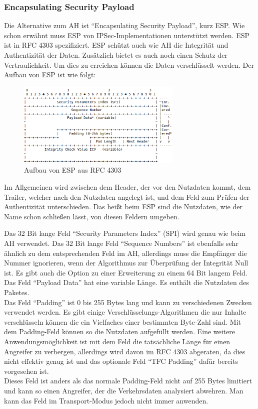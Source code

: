 \documentclass[12pt]{scrartcl}
\begin{document}
\subsubsection{Encapsulating Security Payload}
Die Alternative zum AH ist "`Encapsulating Security Payload"', kurz ESP. Wie schon erwähnt muss ESP von IPSec-Implementationen unterstützt werden. ESP ist in RFC 4303 spezifiziert.\cite{RFC4303}
ESP schützt auch wie AH die Integrität und Authentizität der Daten. Zusätzlich bietet es auch noch einen Schutz der Vertraulichkeit. Um dies zu erreichen können die Daten verschlüsselt werden. Der Aufbau von ESP ist wie folgt:
\begin{figure}[htbp] 
  \centering
     \includegraphics[width=0.7\textwidth]{ESP-Aufbau.png}
  \caption{Aufbau von ESP aus RFC 4303}
  \label{ESP-Aufbau}
\end{figure}
Im Allgemeinen wird zwischen dem Header, der vor den Nutzdaten kommt, dem Trailer, welcher nach den Nutzdaten angelegt ist, und dem Feld zum Prüfen der Authentizität unterschieden. Das heißt beim ESP sind die Nutzdaten, wie der Name schon schließen lässt, von diesen Feldern umgeben.

Das 32 Bit lange Feld "`Security Parameters Index"' (SPI) wird genau wie beim AH verwendet. Das 32 Bit lange Feld "`Sequence Numbers"' ist ebenfalls sehr ähnlich zu dem entsprechenden Feld im AH, allerdings muss die Empfänger die Nummer ignorieren, wenn der Algorithmus zur Überprüfung der Integrität Null ist. Es gibt auch die Option zu einer Erweiterung zu einem 64 Bit langem Feld.\\
Das Feld "`Payload Data"' hat eine variable Länge. Es enthält die Nutzdaten des Paketes.\\ 
Das Feld "`Padding"' ist 0 bis 255 Bytes lang und kann zu verschiedenen Zwecken verwendet werden. Es gibt einige Verschlüsselungs-Algorithmen die nur Inhalte verschlüsseln können die ein Vielfaches einer bestimmten Byte-Zahl sind. Mit dem Padding-Feld können so die Nutzdaten aufgefüllt werden. Eine weitere Anwendungsmöglichkeit ist mit dem Feld die tatsächliche Länge für einen Angreifer zu verbergen, allerdings wird davon im RFC 4303 abgeraten, da dies nicht effektiv genug ist und das optionale Feld "`TFC Padding"' dafür bereits vorgesehen ist.\cite{RFC4303}\\ 
Dieses Feld ist anders als das normale Padding-Feld nicht auf 255 Bytes limitiert und kann so einen Angreifer, der die Verkehrsdaten analysiert abwehren. Man kann das Feld im Transport-Modus jedoch nicht immer anwenden. 
\end{document}
